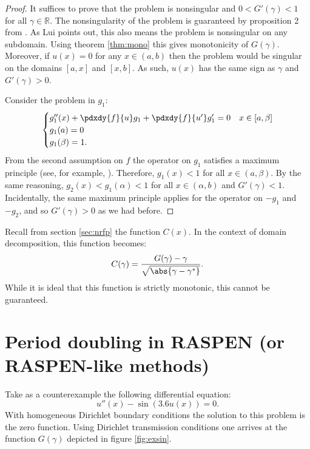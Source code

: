 \documentclass{article}
\begin{document}
\begin{proof}
It suffices to prove that the problem is nonsingular and $0 < G'(\gamma) < 1$ for all $\gamma \in \mathbb{R}$.
The nonsingularity of the problem is guaranteed by proposition 2 from \cite{lui1999schwarz}.
As Lui points out, this also means the problem is nonsingular on any subdomain.
Using theorem \ref{thm:mono} this gives monotonicity of $G(\gamma)$.
Moreover, if $u(x)=0$ for any $x \in (a,b)$ then the problem would be singular on the domains $[a,x]$ and $[x,b]$.
As such, $u(x)$ has the same sign as $\gamma$ and $G'(\gamma) > 0$.

Consider the problem in $g_1$:
\begin{equation*}
\begin{cases} g_1''(x) + \pdxdy{f}{u} g_1 + \pdxdy{f}{u'} g_1' = 0 & x \in [a,\beta] \\ g_1(a) = 0 \\ g_1(\beta) = 1 . \end{cases}
\end{equation*}
From the second assumption on $f$ the operator on $g_1$ satisfies a maximum principle (see, for example, \cite{lui1999schwarz}).
Therefore, $g_1(x) < 1$ for all $x \in (a,\beta)$.
By the same reasoning, $g_2(x) < g_1(\alpha) < 1$ for all $x \in (\alpha, b)$ and $G'(\gamma) < 1$.
Incidentally, the same maximum principle applies for the operator on $-g_1$ and $-g_2$, and so $G'(\gamma) > 0$ as we had before.
\end{proof}

Recall from section \ref{sec:nrfp} the function $C(x)$.
In the context of domain decomposition, this function becomes:
\begin{equation*}
C(\gamma) = \frac{ G(\gamma) - \gamma}{\sqrt{\abs{\gamma - \gamma^*}}} .
\end{equation*}
While it is ideal that this function is strictly monotonic, this cannot be guaranteed.

\section{Period doubling in RASPEN (or RASPEN-like methods)}

Take as a counterexample the following differential equation:
\begin{equation*}
u''(x) - \sin(3.6 u(x)) = 0 .
\end{equation*}
With homogeneous Dirichlet boundary conditions the solution to this problem is the zero function.
Using Dirichlet transmission conditions one arrives at the function $G(\gamma)$ depicted in figure \ref{fig:exsin}.
\end{document}
